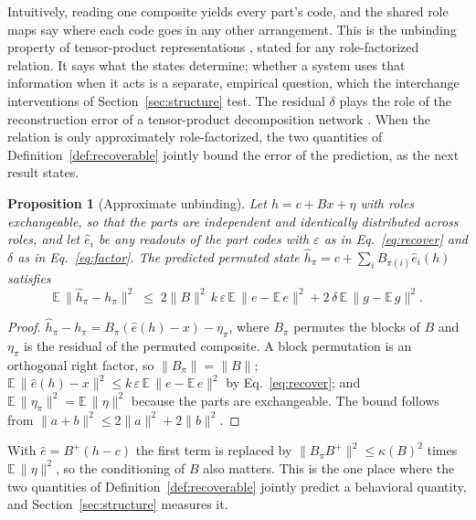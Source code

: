 \documentclass[10pt]{article}
\theoremstyle{plain}
\newtheorem{proposition}{Proposition}
\theoremstyle{remark}
\begin{document}
\noindent
Intuitively, reading one composite yields every part's code, and the shared role maps say where each code goes in any other arrangement. This is the unbinding property of tensor-product representations \citep{smolensky1990}, stated for any role-factorized relation. It says what the states determine; whether a system uses that information when it acts is a separate, empirical question, which the interchange interventions of Section~\ref{sec:structure} test. The residual $\delta$ plays the role of the reconstruction error of a tensor-product decomposition network \citep{mccoy2019}. When the relation is only approximately role-factorized, the two quantities of Definition~\ref{def:recoverable} jointly bound the error of the prediction, as the next result states.

\begin{proposition}[Approximate unbinding]
\label{prop:approx}
Let $h = c + Bx + \eta$ with roles exchangeable, so that the parts are independent and identically distributed across roles, and let $\hat{e}_i$ be any readouts of the part codes with $\varepsilon$ as in Eq.~\eqref{eq:recover} and $\delta$ as in Eq.~\eqref{eq:factor}. The predicted permuted state $\hat{h}_\pi = c + \sum_i B_{\pi(i)}\hat{e}_i(h)$ satisfies
\begin{equation}
  \mathbb{E}\,\lVert \hat{h}_\pi - h_\pi \rVert^2 \;\le\; 2\lVert B \rVert^2\, k\,\varepsilon\, \mathbb{E}\,\lVert e - \mathbb{E}\,e \rVert^2 + 2\,\delta\, \mathbb{E}\,\lVert g - \mathbb{E}\,g \rVert^2 .
\end{equation}
\end{proposition}

\begin{proof}
$\hat{h}_\pi - h_\pi = B_\pi(\hat{e}(h) - x) - \eta_\pi$, where $B_\pi$ permutes the blocks of $B$ and $\eta_\pi$ is the residual of the permuted composite. A block permutation is an orthogonal right factor, so $\lVert B_\pi \rVert = \lVert B \rVert$; $\mathbb{E}\,\lVert \hat{e}(h) - x \rVert^2 \le k\,\varepsilon\,\mathbb{E}\,\lVert e - \mathbb{E}\,e\rVert^2$ by Eq.~\eqref{eq:recover}; and $\mathbb{E}\,\lVert \eta_\pi \rVert^2 = \mathbb{E}\,\lVert \eta \rVert^2$ because the parts are exchangeable. The bound follows from $\lVert a + b \rVert^2 \le 2\lVert a \rVert^2 + 2\lVert b \rVert^2$.
\end{proof}

\noindent
With $\hat{e} = B^{+}(h - c)$ the first term is replaced by $\lVert B_\pi B^{+} \rVert^2 \le \kappa(B)^2$ times $\mathbb{E}\,\lVert \eta \rVert^2$, so the conditioning of $B$ also matters. This is the one place where the two quantities of Definition~\ref{def:recoverable} jointly predict a behavioral quantity, and Section~\ref{sec:structure} measures it.
\end{document}
